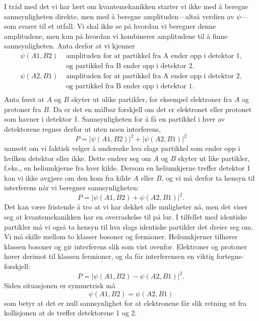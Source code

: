I tråd med det vi har lært om kvantemekanikken starter vi ikke med å beregne sannsynligheten direkte, men med å beregne amplituden---altså verdien av $\psi$---som svarer til et utfall. Vi skal ikke se på hvordan vi beregner denne amplitudene, men kun på hvordan vi kombinerer amplitudene til å finne sannsynligheten. Anta derfor at vi kjenner
\begin{align*}
	\psi(A1, B2) &\text{ amplituden for at partikkel fra A ender opp i detektor 1,} \\
	&\text{ og partikkel fra B ender opp i detektor 2}. \\
	\psi(A2, B1) &\text{ amplituden for at partikkel fra A ender opp i detektor 2,} \\
	&\text{ og partikkel fra B ender opp i detektor 1}. \\
\end{align*}
Anta først at $A$ og $B$ skyter ut ulike partikler, for eksempel elektroner fra $A$ og protoner fra $B$. Da er det en målbar forskjell om det er elektronet eller protonet som havner i detektor 1. Sannsynligheten for å få en partikkel i hver av detektorene regnes derfor ut uten noen interferens,
\begin{displaymath}
	P = |\psi(A1, B2)|^2 + |\psi(A2, B1)|^2
\end{displaymath}
uansett om vi faktisk velger å undersøke hva slags partikkel som ender opp i hvilken detektor eller ikke. Dette endrer seg om $A$ og $B$ skyter ut like partikler, f.eks., en heliumkjerne fra hver kilde. Dersom en heliumkjerne treffer detektor 1 kan vi ikke avgjøre om den kom fra kilde $A$ eller $B$, og vi må derfor ta hensyn til interferens når vi beregner sannsynligheten:
\begin{displaymath}
	P = |\psi(A1, B2) + \psi(A2, B1)|^2.
\end{displaymath}
Det kan være fristende å tro at vi har dekket alle muligheter nå, men det viser seg at kvantemekanikken har en overraskelse til på lur. I tilfellet med identiske partikler må vi også ta hensyn til hva slags identiske partikler det dreier seg om. Vi må skille mellom to klasser bosoner og fermioner. Heliumkjerner tilhører klassen bosoner og gir interferens slik som vist ovenfor. Elektroner og protoner hører derimot til klassen fermioner, og da får interferensen en viktig fortegns-forskjell:
\begin{displaymath}
	P = |\psi(A1, B2) - \psi(A2, B1)|^2.
\end{displaymath}
Siden situasjonen er symmetrisk må 
\begin{displaymath}
	\psi(A1, B2) = \psi(A2, B1)
\end{displaymath}
som betyr at det er null sannsynlighet for at elektronene får slik retning ut fra kollisjonen at de treffer detektorene 1 og 2.

